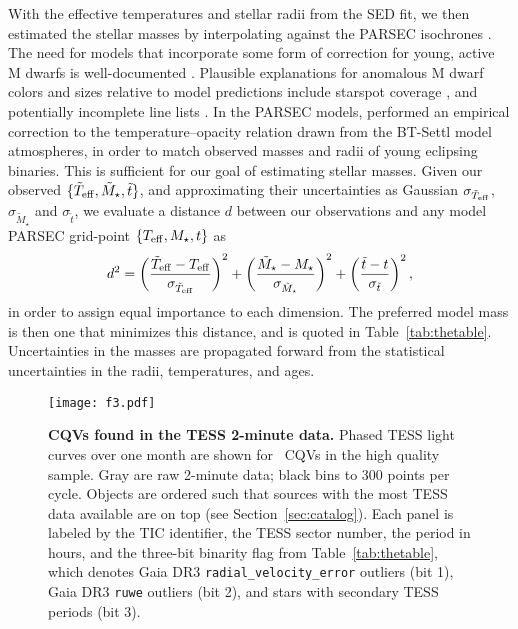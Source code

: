 \documentclass[11pt,twocolumn,tighten]{aastex63}
\begin{document}
With the effective temperatures and stellar radii from the SED fit, we
then estimated the stellar masses by interpolating against the PARSEC
isochrones \citep[v1.2S][]{2014MNRAS.444.2525C}.  The need for models
that incorporate some form of correction for young, active M dwarfs is
well-documented
\citep[e.g.][]{2012ApJ...756...47S,2015ApJ...804..146D,2016A&A...593A..99F,2020ApJ...891...29S}.
Plausible explanations for anomalous M dwarf colors and sizes relative
to model predictions include starspot coverage
\citep[e.g.][]{2017ApJ...836..200G}, and potentially incomplete line
lists \citep[e.g.][]{2013A&A...556A..15R}.  In the PARSEC models,
\citet{2014MNRAS.444.2525C} performed an empirical correction to the
temperature--opacity relation drawn from the BT-Settl model
atmospheres, in order to match observed masses and radii of young
eclipsing binaries.  This is sufficient for our goal of estimating
stellar masses.  Given our observed $\{ \tilde{T}_{\rm eff},
\tilde{M}_\star, \tilde{t} \}$, and approximating their uncertainties
as Gaussian $\sigma_{\tilde{T}_{\rm eff}}$, $\sigma_{\tilde{M}_\star}$
and $\sigma_{\tilde{t}}$, we evaluate a distance $d$ between our
observations and any model PARSEC grid-point $\{ T_{\rm eff}, M_\star,
t \}$ as
\begin{equation}
  d^2 = 
  \left( \frac{\tilde{T}_{\rm eff} - T_{\rm eff}}{\sigma_{\tilde{T}_{\rm eff}}} \right)^2
  +
  \left( \frac{\tilde{M}_{\star} - M_{\star}}{\sigma_{\tilde{M}_{\star}}} \right)^2
  +
  \left( \frac{\tilde{t} - t}{\sigma_{\tilde{t}}} \right)^2,
\end{equation}
in order to assign equal importance to each dimension.  The preferred
model mass is then one that minimizes this distance, and is quoted in
Table~\ref{tab:thetable}.  Uncertainties in the masses are propagated
forward from the statistical uncertainties in the radii, temperatures,
and ages.



\begin{figure*}[!tp]
	\begin{center}
		\centering
		\texttt{[image: f3.pdf]}
    \vspace{-0.3cm}
		\caption{
      {\bf CQVs found in the TESS 2-minute data.}
      Phased TESS light curves over one month are shown for \ngoods\
      CQVs in the high quality sample.  Gray are raw 2-minute data;
      black bins to 300 points per cycle.  Objects are ordered such
      that sources with the most TESS data available are on top (see
      Section~\ref{sec:catalog}).  
      Each panel is labeled by
      the TIC identifier, the TESS sector number, the period in
      hours, and the three-bit binarity flag from Table~\ref{tab:thetable},
      which denotes Gaia DR3 \texttt{radial\_velocity\_error} outliers
      (bit 1), Gaia DR3 \texttt{ruwe} outliers (bit 2), and stars with
      secondary TESS periods (bit 3). 
		}
		\label{fig:cqvs}
	\end{center}
\end{figure*}
\end{document}
